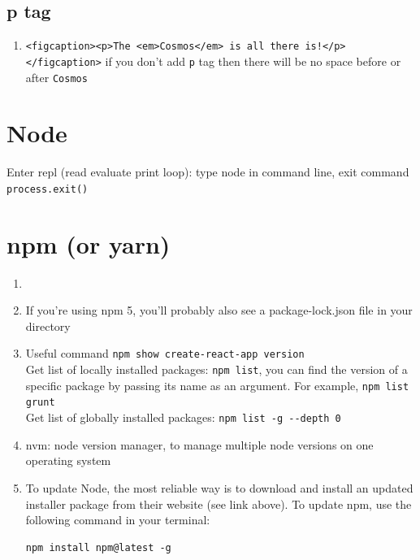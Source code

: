 \documentclass[a4paper, 12pt]{article}
\begin{document}
\subsection{p tag}
\begin{enumerate}
\item \verb|<figcaption><p>The <em>Cosmos</em> is all there is!</p></figcaption>| if you don't add \verb|p| tag then there will be no space before or after \verb|Cosmos|
\end{enumerate}


\section{Node}
Enter repl (read evaluate print loop): type node in command line, exit command \verb|process.exit()|



\section{npm (or yarn)}
\begin{enumerate}

\item 

\item If you're using npm 5, you'll probably also see a package-lock.json file in your directory

\item Useful command \verb|npm show create-react-app version|\\
Get list of locally installed packages: \verb|npm list|, you can find the version of a specific package by passing its name as an argument. For example, \verb|npm list grunt|\\
Get list of globally installed packages: \verb|npm list -g --depth 0|

\item nvm: node version manager, to manage multiple node versions on one operating system

\item To update Node, the most reliable way is to download and install an updated installer package from their website (see link above). To update npm, use the following command in your terminal:
\begin{verbatim}
npm install npm@latest -g
\end{verbatim}
\end{enumerate}
\end{document}
